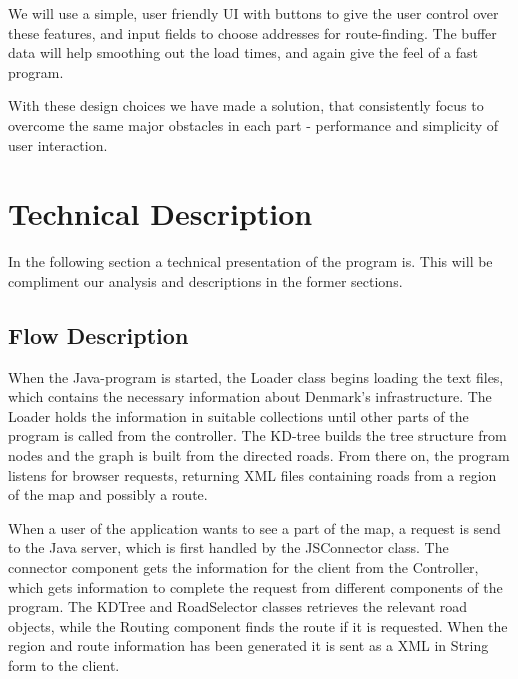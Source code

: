 \documentclass[a4paper,10pt,titlepage]{article}
\begin{document}
We will use a simple, user friendly UI with buttons to give the user control over these features, and input fields to choose addresses for route-finding. The buffer data will help smoothing out the load times, and again give the feel of a fast program.

With these design choices we have made a solution, that consistently focus to overcome the same major obstacles in each part - performance and simplicity of user interaction.
			
	\newpage		
	\section{Technical Description}
		In the following section a technical presentation of the program is. This will be compliment our analysis and descriptions in the former sections.  
		
		\subsection{Flow Description}

		When the Java-program is started, the Loader class begins loading the text files, which contains the necessary information about Denmark's infrastructure. The Loader holds the information in suitable collections until other parts of the program is called from the controller. The KD-tree builds the tree structure from nodes and the graph is built from the directed roads. From there on, the program listens for browser requests, returning XML files containing roads from a region of the map and possibly a route.

When a user of the application wants to see a part of the map, a request is send to the Java server, which is first handled by the JSConnector class.  The connector component gets the information for the client from the Controller, which gets information to complete the request from different components of the program. The KDTree and RoadSelector classes retrieves the relevant road objects, while the Routing component finds the route if it is requested. When the region and route information has been generated it is sent as a XML in String form to the client. 
\end{document}
